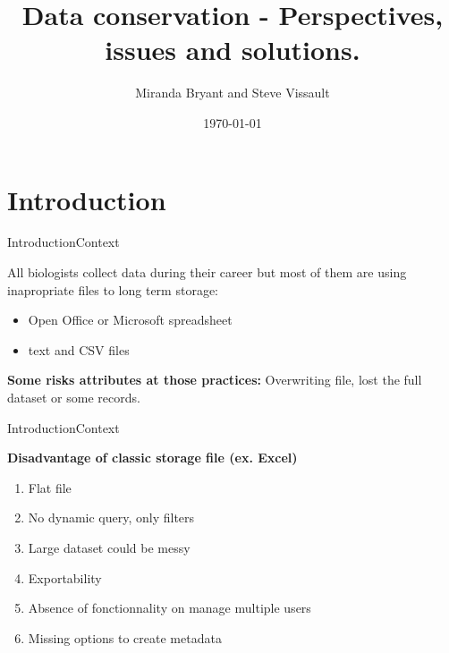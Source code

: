 \documentclass{eecslides}
\title[Data Storage]{Data conservation - Perspectives, issues and solutions.}
\author[M. B. \& S. V.]{\color{white}  Miranda Bryant and Steve Vissault}
\institute[\color{white} UQAR]{\color{white} \textbf{Les midis numériques}}
\date{ \color{white} \today}
\begin{document}
\begin{frame}[plain]
\titlepage
\end{frame}


\section{Introduction}

\begin{frame}{Introduction}{Context}

All biologists collect data during their career but most of them are using \alert{inapropriate files} to long term storage:

\begin{itemize}
	\item  Open Office or Microsoft spreadsheet
	\item  text and CSV files
\end{itemize}

\textbf{Some risks attributes at those practices:} Overwriting file, lost the full dataset or some records.

\end{frame}


\begin{frame}{Introduction}{Context}

\textbf{\alert{Disadvantage of classic storage file (ex. Excel)}}

\begin{enumerate}
	\item Flat file
	\item No dynamic query, only filters
	\item Large dataset could be messy
	\item Exportability %
	\item Absence of fonctionnality on manage multiple users
	\item Missing options to create metadata
\end{enumerate}



\end{frame}
\end{document}
